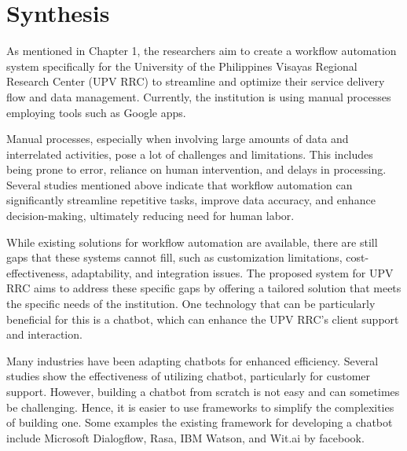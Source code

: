\begin{table}
	
\end{table}

\section{Synthesis}

As mentioned in Chapter 1, the researchers aim to create a workflow automation system specifically for the University of the Philippines Visayas Regional Research Center (UPV RRC) to streamline and optimize their service delivery flow and data management. Currently, the institution is using manual processes employing tools such as Google apps.

Manual processes, especially when involving large amounts of data and interrelated activities, pose a lot of challenges and limitations. This includes being prone to error, reliance on human intervention, and delays in processing. Several studies mentioned above indicate that workflow automation can significantly streamline repetitive tasks, improve data accuracy, and enhance decision-making, ultimately reducing need for human labor. 

While existing solutions for workflow automation are available, there are still gaps that these systems cannot fill, such as customization limitations, cost-effectiveness, adaptability, and integration issues. The proposed system for UPV RRC aims to address these specific gaps by offering a tailored solution that meets the specific needs of the institution. One technology that can be particularly beneficial for this is a chatbot, which can enhance the UPV RRC’s client support and interaction. 

Many industries have been adapting chatbots for enhanced efficiency. Several studies show the effectiveness of utilizing chatbot, particularly for customer support. However, building a chatbot from scratch is not easy and can sometimes be challenging. Hence, it is easier to use frameworks to simplify the complexities of building one. Some examples the existing framework for developing a chatbot include Microsoft Dialogflow, Rasa, IBM Watson, and Wit.ai by facebook.














